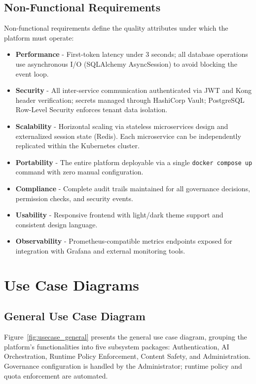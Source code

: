 \subsection{Non-Functional Requirements}

Non-functional requirements define the quality attributes under which the platform must operate:

\begin{itemize}
    \item \textbf{Performance} - First-token latency under 3 seconds; all database operations use asynchronous I/O (SQLAlchemy AsyncSession) to avoid blocking the event loop.
    \item \textbf{Security} - All inter-service communication authenticated via JWT and Kong header verification; secrets managed through HashiCorp Vault; PostgreSQL Row-Level Security enforces tenant data isolation.
    \item \textbf{Scalability} - Horizontal scaling via stateless microservices design and externalized session state (Redis). Each microservice can be independently replicated within the Kubernetes cluster.
    \item \textbf{Portability} - The entire platform deployable via a single \texttt{docker compose up} command with zero manual configuration.
    \item \textbf{Compliance} - Complete audit trails maintained for all governance decisions, permission checks, and security events.
    \item \textbf{Usability} - Responsive frontend with light/dark theme support and consistent design language.
    \item \textbf{Observability} - Prometheus-compatible metrics endpoints exposed for integration with Grafana and external monitoring tools.
\end{itemize}


\section{Use Case Diagrams}

\subsection{General Use Case Diagram}

Figure~\ref{fig:usecase_general} presents the general use case diagram, grouping the platform's functionalities into five subsystem packages: Authentication, AI Orchestration, Runtime Policy Enforcement, Content Safety, and Administration. Governance configuration is handled by the Administrator; runtime policy and quota enforcement are automated.

